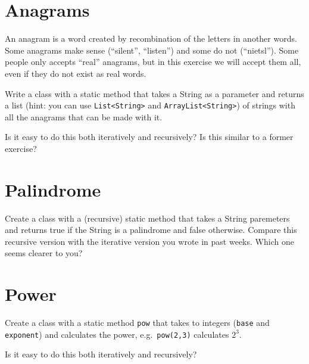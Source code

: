 \documentclass{article}
\begin{document}
\section{Anagrams}
\label{sec:anagrams}

An anagram is a word created by recombination of the letters in
another words. Some anagrams make sense (``silent'', ``listen'') and
some do not (``nietsl''). Some people only accepts ``real'' anagrams,
but in this exercise we will accept them all, even if they do not
exist as real words. 

Write a class with a static method that takes a String as a parameter
and returns a list (hint: you can use \verb+List<String>+ and
\verb+ArrayList<String>+) of strings with all the anagrams that can be
made with it. 

Is it easy to do this both iteratively and recursively? Is this
similar to a former exercise?

\section{Palindrome}
\label{sec:palindrome}

Create a class with a (recursive) static method that takes a String
paremeters and
returns true if the String is a palindrome and false
otherwise. Compare this recursive version with the iterative version
you wrote in past weeks. Which one seems clearer to you?

\section{Power}
\label{sec:power}

Create a class with a static method \verb+pow+ that takes to integers
(\verb+base+ and \verb+exponent+) and calculates the power, 
e.g.~\verb+pow(2,3)+ calculates $2^3$. 

Is it easy to do this both iteratively and recursively? 



\end{document}

